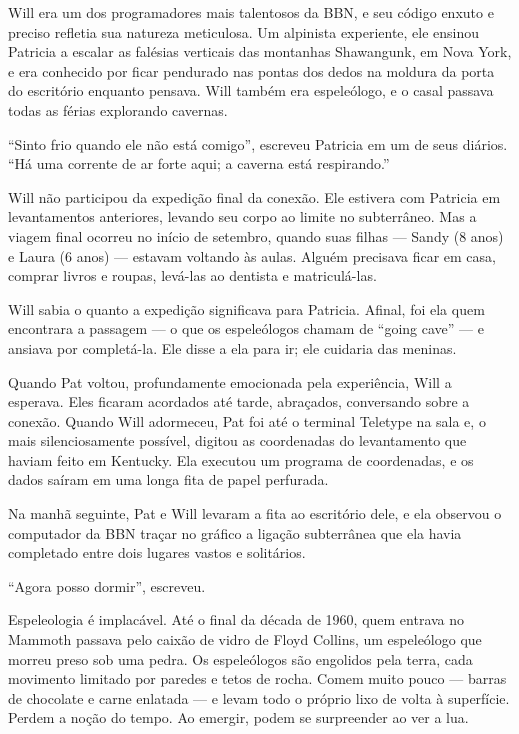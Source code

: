 \documentclass[12pt,a4paper]{article}
\begin{document}
Will era um dos programadores mais talentosos da BBN, e seu código enxuto e preciso refletia sua natureza meticulosa.
Um alpinista experiente, ele ensinou Patricia a escalar as falésias verticais das montanhas Shawangunk, em Nova York, e era conhecido por ficar pendurado nas pontas dos dedos na moldura da porta do escritório enquanto pensava.
Will também era espeleólogo, e o casal passava todas as férias explorando cavernas.

“Sinto frio quando ele não está comigo”,
escreveu Patricia em um de seus diários.
“Há uma corrente de ar forte aqui; a caverna está respirando.”

Will não participou da expedição final da conexão.
Ele estivera com Patricia em levantamentos anteriores, levando seu corpo ao limite no subterrâneo.
Mas a viagem final ocorreu no início de setembro, quando suas filhas — Sandy (8 anos) e Laura (6 anos) — estavam voltando às aulas.
Alguém precisava ficar em casa, comprar livros e roupas, levá-las ao dentista e matriculá-las.

Will sabia o quanto a expedição significava para Patricia. Afinal, foi ela quem encontrara a passagem — o que os espeleólogos chamam de “going cave” — e ansiava por completá-la.
Ele disse a ela para ir; ele cuidaria das meninas.

Quando Pat voltou, profundamente emocionada pela experiência, Will a esperava.
Eles ficaram acordados até tarde, abraçados, conversando sobre a conexão.
Quando Will adormeceu, Pat foi até o terminal Teletype na sala e, o mais silenciosamente possível, digitou as coordenadas do levantamento que haviam feito em Kentucky.
Ela executou um programa de coordenadas, e os dados saíram em uma longa fita de papel perfurada.

Na manhã seguinte, Pat e Will levaram a fita ao escritório dele, e ela observou o computador da BBN traçar no gráfico a ligação subterrânea que ela havia completado entre dois lugares vastos e solitários.

“Agora posso dormir”, escreveu.

Espeleologia é implacável.
Até o final da década de 1960, quem entrava no Mammoth passava pelo caixão de vidro de Floyd Collins, um espeleólogo que morreu preso sob uma pedra.
Os espeleólogos são engolidos pela terra, cada movimento limitado por paredes e tetos de rocha.
Comem muito pouco — barras de chocolate e carne enlatada — e levam todo o próprio lixo de volta à superfície.
Perdem a noção do tempo.
Ao emergir, podem se surpreender ao ver a lua.
\end{document}

